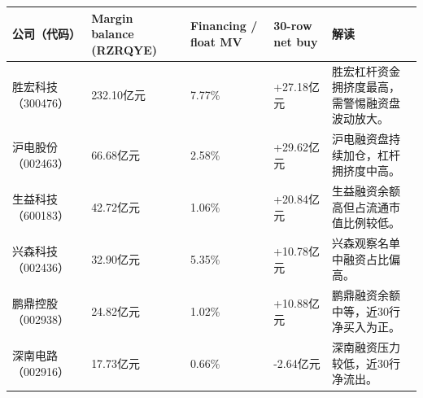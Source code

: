 \begin{exhibitbox}
\footnotesize
\begin{tabularx}{\textwidth}{L{1.8cm}R{1.8cm}R{1.8cm}R{1.6cm}X}
\toprule
\textbf{公司（代码）} & \textbf{Margin balance (RZRQYE)} & \textbf{Financing / float MV} & \textbf{30-row net buy} & \textbf{解读} \\
\midrule
胜宏科技（300476） & 232.10亿元 & 7.77\% & +27.18亿元 & 胜宏杠杆资金拥挤度最高，需警惕融资盘波动放大。 \\
沪电股份（002463） & 66.68亿元 & 2.58\% & +29.62亿元 & 沪电融资盘持续加仓，杠杆拥挤度中高。 \\
生益科技（600183） & 42.72亿元 & 1.06\% & +20.84亿元 & 生益融资余额高但占流通市值比例较低。 \\
兴森科技（002436） & 32.90亿元 & 5.35\% & +10.78亿元 & 兴森观察名单中融资占比偏高。 \\
鹏鼎控股（002938） & 24.82亿元 & 1.02\% & +10.88亿元 & 鹏鼎融资余额中等，近30行净买入为正。 \\
深南电路（002916） & 17.73亿元 & 0.66\% & -2.64亿元 & 深南融资压力较低，近30行净流出。 \\
\bottomrule
\end{tabularx}
\end{exhibitbox}

